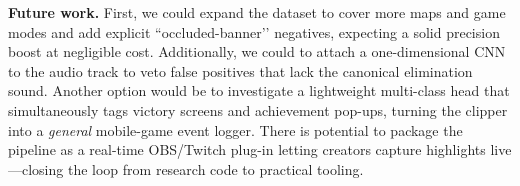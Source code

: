 \documentclass[10pt,twocolumn,letterpaper]{article}
\begin{document}
\vspace{0.4em}
\noindent\textbf{Future work.}
First, we could expand the dataset to cover more maps and game modes and
add explicit “occluded-banner’’ negatives, expecting a solid precision
boost at negligible cost.  Additionally, we could to attach a one-dimensional
CNN to the audio track to veto false positives that lack the canonical
elimination sound.  Another option would be to investigate a lightweight
multi-class head that simultaneously tags victory screens and
achievement pop-ups, turning the clipper into a \emph{general} mobile-game
event logger.  There is potential to package the pipeline as a real-time OBS/Twitch
plug-in letting creators capture highlights live—closing the loop from
research code to practical tooling.

{\small


}
\end{document}
